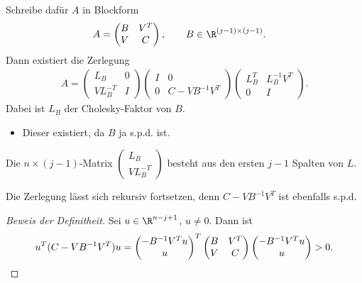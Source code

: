 Schreibe dafür $A$ in Blockform
\begin{align*}
 A & =\begin{pmatrix}
        B & V^T \\
        V & C
      \end{pmatrix},
  \qquad B \in \R^{(j-1) \times (j-1)}.
\end{align*}
Dann existiert die Zerlegung
\begin{align*}
 A
 =
 \begin{pmatrix}
  L_B & 0 \\
  VL_B^{-T} & I
 \end{pmatrix}
 \begin{pmatrix}
  I & 0 \\
  0 & C-VB^{-1}V^T
 \end{pmatrix}
 \begin{pmatrix}
  L_B^T & L_B^{-1}V^T \\
  0 & I
 \end{pmatrix}.
\end{align*}
Dabei ist $L_B$ der Cholesky-Faktor von $B$.
\begin{itemize}
 \item Dieser existiert, da $B$ ja s.p.d. ist.
\end{itemize}
\begin{lemma}
\label{lem:rows_of_cholesky_factor}
 Die $n \times (j-1)$-Matrix $\begin{pmatrix}L_B \\ V L_B^{-T}\end{pmatrix}$ besteht
 aus den ersten $j-1$ Spalten von $L$.
\end{lemma}
Die Zerlegung lässt sich rekursiv fortsetzen, denn $C-VB^{-1}V^T$ ist ebenfalls s.p.d.
\begin{proof}[Beweis der Definitheit]
 Sei $u \in \R^{n-j+1}$, $u \neq 0$.  Dann ist
 \begin{equation*}
  u^T(C-VB^{-1}V^T)u
  =
 \begin{pmatrix}
  -B^{-1} V^T u \\ u
 \end{pmatrix}^T
 \begin{pmatrix}
  B & V^T \\ V & C
 \end{pmatrix}
 \begin{pmatrix}
  -B^{-1} V^T u \\ u
 \end{pmatrix}
 >
 0. \qedhere
 \end{equation*}
\end{proof}


